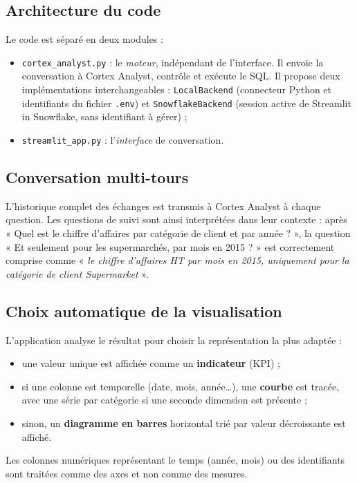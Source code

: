\subsection{Architecture du code}
Le code est séparé en deux modules :
\begin{itemize}
  \item \texttt{cortex\_analyst.py} : le \emph{moteur}, indépendant de l'interface. Il envoie la
        conversation à Cortex Analyst, contrôle et exécute le SQL. Il propose deux implémentations
        interchangeables : \texttt{LocalBackend} (connecteur Python et identifiants du fichier
        \texttt{.env}) et \texttt{SnowflakeBackend} (session active de Streamlit in Snowflake, sans
        identifiant à gérer) ;
  \item \texttt{streamlit\_app.py} : l'\emph{interface} de conversation.
\end{itemize}

\subsection{Conversation multi-tours}
L'historique complet des échanges est transmis à Cortex Analyst à chaque question. Les questions de
suivi sont ainsi interprétées dans leur contexte : après « Quel est le chiffre d'affaires par catégorie
de client et par année ? », la question « Et seulement pour les supermarchés, par mois en 2015 ? » est
correctement comprise comme « \emph{le chiffre d'affaires HT par mois en 2015, uniquement pour la
catégorie de client Supermarket} ».

\subsection{Choix automatique de la visualisation}
L'application analyse le résultat pour choisir la représentation la plus adaptée :
\begin{itemize}
  \item une valeur unique est affichée comme un \textbf{indicateur} (KPI) ;
  \item si une colonne est temporelle (date, mois, année\ldots), une \textbf{courbe} est tracée, avec une
        série par catégorie si une seconde dimension est présente ;
  \item sinon, un \textbf{diagramme en barres} horizontal trié par valeur décroissante est affiché.
\end{itemize}
Les colonnes numériques représentant le temps (année, mois) ou des identifiants sont traitées comme des
axes et non comme des mesures.

